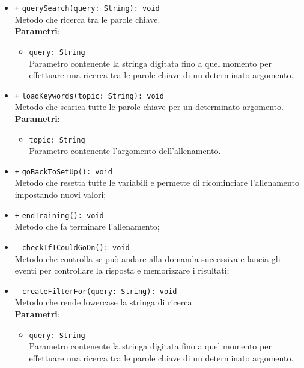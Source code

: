 \begin{itemize}
\begin{itemize}
\begin{itemize}
		\end{itemize}
		\item \texttt{+} \texttt{querySearch(query: String): void} \\
		Metodo che ricerca tra le parole chiave. \\
		\textbf{Parametri}:
		\begin{itemize}
			\item \texttt{query: String} \\
			Parametro contenente la stringa digitata fino a quel momento per effettuare una ricerca tra le parole chiave di un determinato argomento.
		\end{itemize}
		\item \texttt{+} \texttt{loadKeywords(topic: String): void} \\
		Metodo che scarica tutte le parole chiave per un determinato argomento. \\
		\textbf{Parametri}:
		\begin{itemize}
			\item \texttt{topic: String} \\
			Parametro contenente l'argomento dell'allenamento.
		\end{itemize}
		\item \texttt{+} \texttt{goBackToSetUp(): void} \\
		Metodo che resetta tutte le variabili e permette di ricominciare l'allenamento impostando nuovi valori; \\
		\item \texttt{+} \texttt{endTraining(): void} \\
		Metodo che fa terminare l'allenamento; \\
		\item \texttt{-} \texttt{checkIfICouldGoOn(): void} \\
		Metodo che controlla se può andare alla domanda successiva e lancia gli eventi per controllare la risposta e memorizzare i risultati; \\
		\item \texttt{-} \texttt{createFilterFor(query: String): void} \\
		Metodo che rende lowercase la stringa di ricerca. \\
		\textbf{Parametri}:
		\begin{itemize}
			\item \texttt{query: String} \\
			Parametro contenente la stringa digitata fino a quel momento per effettuare una ricerca tra le parole chiave di un determinato argomento.

\end{itemize}
\end{itemize}
\end{itemize}
